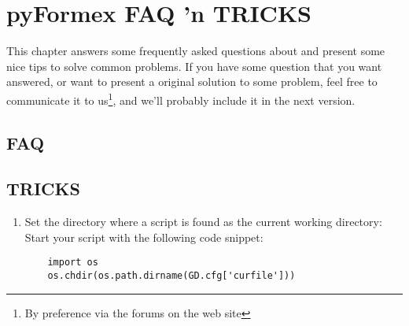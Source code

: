 
\chapter{pyFormex FAQ 'n TRICKS}
\label{cha:faq}

This chapter answers some frequently asked questions about \pyformex and present some nice tips to solve common problems. If you have some question that you want answered, or want to present a original solution to some problem, feel free to communicate it to us\footnote{By preference via the forums on the \pyformex web site}, and we'll probably include it in the next version.  

\section{FAQ}
\label{Sec:faq}

\section{TRICKS}
\label{sec:tricks}

\begin{enumerate}
\item Set the directory where a script is found as the current working directory:
Start your script with the following code snippet:
\begin{verbatim}
    import os
    os.chdir(os.path.dirname(GD.cfg['curfile']))
\end{verbatim}
 
\end{enumerate}


